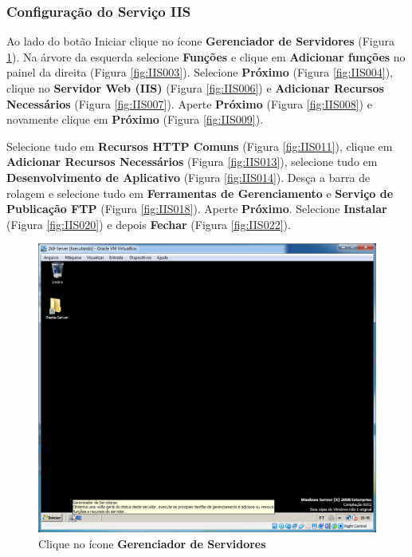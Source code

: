 \documentclass[10pt]{article}
\begin{document}
\subsubsection{Configuração do Serviço IIS}
\par Ao lado do botão Iniciar clique no ícone \textbf{Gerenciador de Servidores} (Figura \ref{fig:IIS001}). Na árvore da esquerda selecione \textbf{Funções} e clique em \textbf{Adicionar funções} no painel da direita (Figura \ref{fig:IIS003}). Selecione \textbf{Próximo} (Figura \ref{fig:IIS004}), clique no \textbf{Servidor Web (IIS)} (Figura \ref{fig:IIS006}) e \textbf{Adicionar Recursos Necessários} (Figura \ref{fig:IIS007}). Aperte \textbf{Próximo} (Figura \ref{fig:IIS008}) e novamente clique em \textbf{Próximo} (Figura \ref{fig:IIS009}). 
\par Selecione tudo em \textbf{Recursos HTTP Comuns} (Figura \ref{fig:IIS011}), clique em \textbf{Adicionar Recursos Necessários} (Figura \ref{fig:IIS013}), selecione tudo em \textbf{Desenvolvimento de Aplicativo} (Figura \ref{fig:IIS014}). Desça a barra de rolagem e selecione tudo em \textbf{Ferramentas de Gerenciamento} e \textbf{Serviço de Publicação FTP} (Figura \ref{fig:IIS018}). Aperte \textbf{Próximo}. Selecione \textbf{Instalar} (Figura \ref{fig:IIS020}) e depois \textbf{Fechar} (Figura \ref{fig:IIS022}).
\begin{figure}[H]
    \centering
    \caption{Clique no ícone \textbf{Gerenciador de Servidores}}
    \label{fig:IIS001}
    \includegraphics[width=\linewidth]{images/IIS/IIS001.png}
\end{figure}
\end{document}
